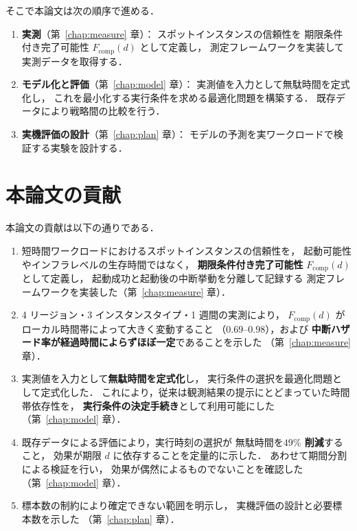 \documentclass[11pt,a4paper]{ltjsreport}
\newcommand{\Fcomp}{F_{\mathrm{comp}}}
\begin{document}
そこで本論文は次の順序で進める．

\begin{enumerate}
  \item \textbf{実測}（第~\ref{chap:measure} 章）：
        スポットインスタンスの信頼性を
        期限条件付き完了可能性 $\Fcomp(d)$ として定義し，
        測定フレームワークを実装して実測データを取得する．
  \item \textbf{モデル化と評価}（第~\ref{chap:model} 章）：
        実測値を入力として無駄時間を定式化し，
        これを最小化する実行条件を求める最適化問題を構築する．
        既存データにより戦略間の比較を行う．
  \item \textbf{実機評価の設計}（第~\ref{chap:plan} 章）：
        モデルの予測を実ワークロードで検証する実験を設計する．
\end{enumerate}

\section{本論文の貢献}

本論文の貢献は以下の通りである．

\begin{enumerate}
  \item 短時間ワークロードにおけるスポットインスタンスの信頼性を，
        起動可能性やインフラレベルの生存時間ではなく，
        \textbf{期限条件付き完了可能性} $\Fcomp(d)$ として定義し，
        起動成功と起動後の中断挙動を分離して記録する
        測定フレームワークを実装した（第~\ref{chap:measure} 章）．
  \item 4 リージョン・3 インスタンスタイプ・1 週間の実測により，
        $\Fcomp(d)$ がローカル時間帯によって大きく変動すること
        （$0.69$--$0.98$），および
        \textbf{中断ハザード率が経過時間によらずほぼ一定}であることを示した
        （第~\ref{chap:measure} 章）．
  \item 実測値を入力として\textbf{無駄時間を定式化}し，
        実行条件の選択を最適化問題として定式化した．
        これにより，従来は観測結果の提示にとどまっていた時間帯依存性を，
        \textbf{実行条件の決定手続き}として利用可能にした
        （第~\ref{chap:model} 章）．
  \item 既存データによる評価により，実行時刻の選択が
        無駄時間を\textbf{$49\%$ 削減}すること，
        効果が期限 $d$ に依存することを定量的に示した．
        あわせて期間分割による検証を行い，
        効果が偶然によるものでないことを確認した
        （第~\ref{chap:model} 章）．
  \item 標本数の制約により確定できない範囲を明示し，
        実機評価の設計と必要標本数を示した
        （第~\ref{chap:plan} 章）．
\end{enumerate}
\end{document}
